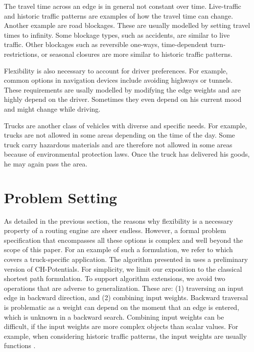 \documentclass[a4paper,UKenglish,cleveref, autoref]{lipics-v2019}
\begin{document}
The travel time across an edge is in general not constant over time.
Live-traffic and historic traffic patterns are examples of how the travel time can change.
Another example are road blockages.
These are usually modelled by setting travel times to infinity.
Some blockage types, such as accidents, are similar to live traffic.
Other blockages such as reversible one-ways, time-dependent turn-restrictions, or seasonal closures are more similar to historic traffic patterns.

Flexibility is also necessary to account for driver preferences.
For example, common options in navigation devices include avoiding highways or tunnels.
These requirements are usally modelled by modifying the edge weights and are highly depend on the driver.
Sometimes they even depend on his current mood and might change while driving.

Trucks are another class of vehicles with diverse and specific needs.
For example, trucks are not allowed in some areas depending on the time of the day.
Some truck carry hazardous materials and are therefore not allowed in some areas because of environmental protection laws.
Once the truck has delivered his goods, he may again pass the area.

\section{Problem Setting}

As detailed in the previous section, the reasons why flexibility is a necessary property of a routing engine are sheer endless.
However, a formal problem specification that encompasses all these options is complex and well beyond the scope of this paper.
For an example of such a formulation, we refer to \cite{sea2020paper} which covers a truck-specific application.
The algorithm presented in \cite{sea2020paper} uses a preliminary version of CH-Potentials. 
For simplicity, we limit our exposition to the classical shortest path formulation.
To support algorithm extensions, we avoid two operations that are adverse to generalization.
These are: 
(1) traversing an input edge in backward direction, and
(2) combining input weights.
Backward traversal is problematic as a weight can depend on the moment that an edge is entered, which is unknown in a backward search.
Combining input weights can be difficult, if the input weights are more complex objects than scalar values.
For example, when considering historic traffic patterns, the input weights are usually functions \cite{citation needed}.
\end{document}
